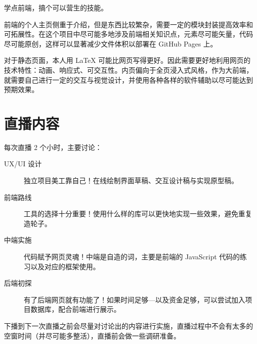 \documentclass[UTF8]{ctexart}
\begin{document}
    学点前端，搞个可以营生的技能。

    前端的个人主页侧重于介绍，但是东西比较繁杂，需要一定的模块封装提高效率和可拓展性。在这个项目中尽可能多地涉及前端相关知识点，元素尽可能矢量，代码尽可能原创，这样可以显著减少文件体积以部署在 GitHub Pages 上。

    对于静态页面，本人用 \LaTeX{} 可能比网页写得更好。因此需要更好地利用网页的技术特性：动画、响应式、可交互性。内页偏向于全页浸入式风格，作为大前端，就需要自己进行一定的交互与视觉设计，并使用各种各样的软件辅助以尽可能达到预期效果。


\section{直播内容}

    每次直播 2 个小时，主要讨论：
    \begin{description}
        \item[UX/UI 设计] 独立项目美工靠自己！在线绘制界面草稿、交互设计稿与实现原型稿。
        \item[前端路线] 工具的选择十分重要！使用什么样的库可以更快地实现一些效果，避免重复造轮子。
        \item[中端实施] 代码赋予网页灵魂！中端是自造的词，主要是前端的 JavaScript 代码的练习以及对应的框架使用。
        \item[后端初探] 有了后端网页就有功能了！如果时间足够---以及资金足够，可以尝试加入项目数据库，配合前端进行展示。 
    \end{description}

    下播到下一次直播之前会尽量对讨论出的内容进行实施，直播过程中不会有太多的空窗时间（并尽可能多整活），直播前会做一些调研准备。

    \begin{figure}[h]
        \centering
    \end{figure}
\end{document}
